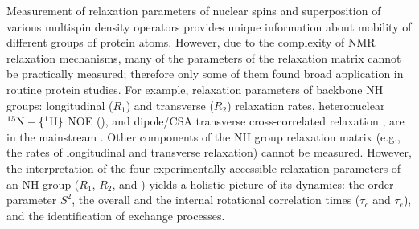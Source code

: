 \documentclass[twocolumn]{svjour3}           %
\begin{document}
Measurement of relaxation parameters of nuclear spins and superposition
of various multispin density operators provides unique information about mobility
of different groups of protein atoms. However, due to the complexity of
NMR relaxation mechanisms, many of the parameters of the relaxation 
matrix cannot be practically measured; therefore only some of them 
found broad application in routine protein studies. For example, 
relaxation parameters of backbone NH groups: \nlab{} longitudinal 
($R_1$) and transverse ($R_2$) relaxation rates, heteronuclear 
${}^{15}\text{N}-\{{}^{1}\text{H}\}$ NOE (\sigmaIS), and dipole\slash CSA transverse 
cross-correlated relaxation \gtwoNNH, are in the mainstream 
\cite{ishima_recent_2011,palmer_1.13_2012}.
Other components of the NH group relaxation matrix (e.g., the rates of
\hlab{} longitudinal and transverse relaxation) cannot be measured. 
However, the interpretation of the four experimentally accessible 
relaxation parameters of an NH group ($R_1$, $R_2$, \sigmaIS{} 
and \gtwoNNH) yields a holistic picture of its dynamics: 
the order parameter $S^2$, the overall and the internal rotational 
correlation times ($\tau_c$ and $\tau_e$), and the identification of 
exchange processes. 
\end{document}

